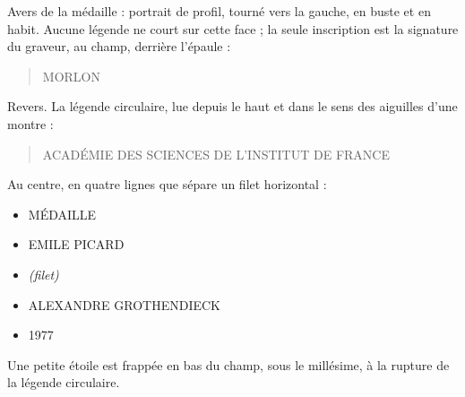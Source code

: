 \documentclass[11pt,a4paper]{article}
\begin{document}
Avers de la médaille : portrait de profil, tourné vers la gauche, en buste et
en habit. Aucune légende ne court sur cette face ; la seule inscription est la
signature du graveur, au champ, derrière l'épaule :

\begin{quote}
MORLON
\end{quote}


Revers. La légende circulaire, lue depuis le haut et dans le sens des aiguilles
d'une montre :

\begin{quote}
ACADÉMIE DES SCIENCES DE L'INSTITUT DE FRANCE
\end{quote}

Au centre, en quatre lignes que sépare un filet horizontal :

\begin{itemize}
\item MÉDAILLE
\item EMILE PICARD
\item \emph{(filet)}
\item ALEXANDRE GROTHENDIECK
\item 1977
\end{itemize}

Une petite étoile est frappée en bas du champ, sous le millésime, à la rupture
de la légende circulaire.

\end{document}
